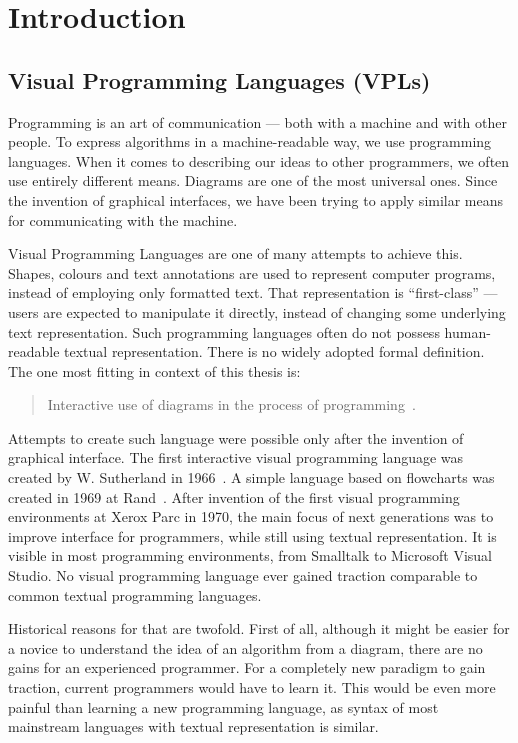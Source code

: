\documentclass[english,mgr,shortabstract]{iithesis}
\author{Łukasz Czapliński}
\date{\today}
\begin{document}
\maketitle

\chapter{Introduction}
\section{Visual Programming Languages (VPLs)}
Programming is an art of communication --- both with a machine and with other
people.
To express algorithms in a machine-readable way, we use programming languages.
When it comes to describing our ideas to other programmers, we often use
entirely different means.
Diagrams are one of the most universal ones.
Since the invention of graphical interfaces, we have been trying to apply
similar means for communicating with the machine.

Visual Programming Languages are one of many attempts to achieve this.
Shapes, colours and text annotations are used to represent computer programs,
instead of employing only formatted text.
That representation is “first-class” --- users are expected to manipulate it
directly, instead of changing some underlying text representation.
Such programming languages often do not possess human-readable textual
representation.
There is no widely adopted formal definition.
The one most fitting in context of this thesis is:
\blockquote{Interactive use of diagrams
  in the process of programming~\cite[Chapter 2]{nickerson1995visual}.}


Attempts to create such language were possible only after the invention of
graphical interface.
The first interactive visual programming language was created by W. Sutherland
in 1966~\cite{firstVPL}.
A simple language based on flowcharts was created in 1969 at Rand~\cite{grail}.
After invention of the first visual programming environments at Xerox Parc in
1970, the main focus of next generations was to improve interface for
programmers, while still using textual representation.
It is visible in most programming environments, from Smalltalk to Microsoft
Visual Studio.
No visual programming language ever gained traction comparable to common textual
programming languages.


Historical reasons for that are twofold.
First of all, although it might be easier for a novice to understand the idea of
an algorithm from a diagram, there are no gains for an experienced programmer.
For a completely new paradigm to gain traction, current programmers would have
to learn it.
This would be even more painful than learning a new programming language, as
syntax of most mainstream languages with textual representation is similar.
\end{document}

